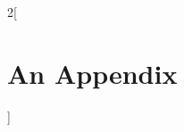 \documentclass[a4paper, 11pt, oneside]{thesis/HSR}  %
\begin{document}


  \appendix %




  \begin{multicols}{2}[\chapter{An Appendix}]
    \label{an_appendix}
    \Blindtext
  \end{multicols}

  \backmatter


  \label{Bibliography}
\end{document}

